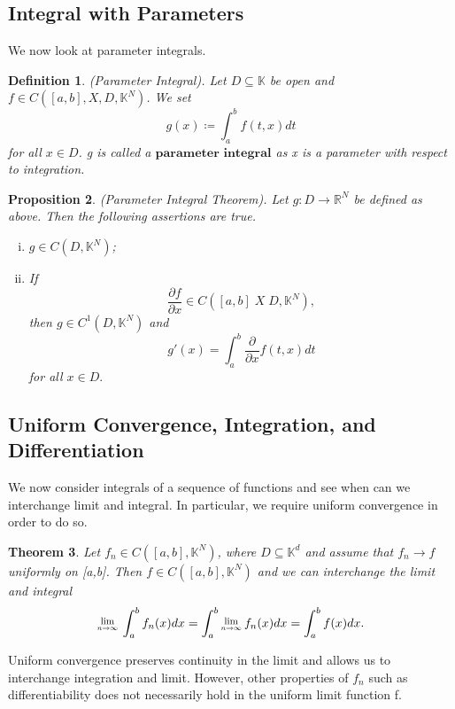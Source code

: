 \documentclass[twoside]{article}
\newcounter{lecnum}
\newcommand{\Lim}[1]{\raisebox{0.5ex}{\scalebox{0.8}{$\displaystyle \lim_{#1}\;$}}}
\newtheorem{theorem}{Theorem}[lecnum]
\newtheorem{proposition}[theorem]{Proposition}
\newtheorem{definition}[theorem]{Definition}
\begin{document}
\subsection{Integral with Parameters}

We now look at parameter integrals.

\begin{definition}(Parameter Integral). Let $D \subseteq \mathbb{K}$ be open and $f \in C([a,b], X, D, \mathbb{K}^N)$. We set 
$$
g(x) \coloneqq \int_a^bf(t,x)dt
$$
for all $x \in D$. g is called a $\textbf{parameter integral}$ as x is a parameter with respect to integration.
\end{definition}

\begin{proposition}(Parameter Integral Theorem). Let $g: D \rightarrow \mathbb{R}^N$ be defined as above. Then the following assertions are true.
\begin{enumerate}[(i)]
    \item $g \in C(D, \mathbb{K}^N)$;
    \item If $$\frac{\partial f}{\partial x} \in C([a,b] \; X\; D, \mathbb{K}^N),$$ then $g \in C^1(D, \mathbb{K}^N)$ and 
    $$
    g'(x) = \int_a^b\frac{\partial}{\partial x}f(t,x)dt
    $$
    for all $x \in D.$
\end{enumerate}
\end{proposition}

\subsection{Uniform Convergence, Integration, and Differentiation}

We now consider integrals of a sequence of functions and see when can we interchange limit and integral. In particular, we require uniform convergence in order to do so.

\begin{theorem} Let $f_n \in C([a,b], \mathbb{K}^N)$, where $D \subseteq \mathbb{K}^d$ and assume that $f_n \rightarrow f$ uniformly on [a,b]. Then $f \in C([a,b], \mathbb{K}^N)$ and we can interchange the limit and integral
$$
\Lim{n \rightarrow \infty}\int_a^bf_n(x)dx = \int_a^b\Lim{n \rightarrow \infty}f_n(x)dx = \int_a^bf(x)dx.
$$

\end{theorem}

Uniform convergence preserves continuity in the limit and allows us to interchange integration and limit. However, other properties of $f_n$ such as differentiability does not necessarily hold in the uniform limit function f. 
\end{document}
